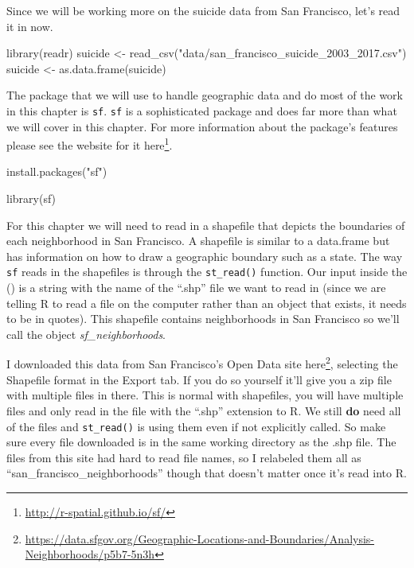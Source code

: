 \documentclass[
]{krantz}
\makeatletter
\newenvironment{Shaded}{\begin{snugshade}}{\end{snugshade}}
\newcommand{\FunctionTok}[1]{\textcolor[rgb]{0,0,0}{#1}}
\newcommand{\NormalTok}[1]{#1}
\newcommand{\OtherTok}[1]{\textcolor[rgb]{0.37,0.37,0.37}{#1}}
\newcommand{\StringTok}[1]{\textcolor[rgb]{0.5,0.5,0.5}{#1}}
\renewcommand{\href}[2]{#2\footnote{\url{#1}}}
\newenvironment{kframe}{%
\medskip{}
\setlength{\fboxsep}{.8em}
 \def\at@end@of@kframe{}%
 \ifinner\ifhmode%
  \def\at@end@of@kframe{\end{minipage}}%
  \begin{minipage}{\columnwidth}%
 \fi\fi%
 \def\FrameCommand##1{\hskip\@totalleftmargin \hskip-\fboxsep
 \colorbox{shadecolor}{##1}\hskip-\fboxsep
     \hskip-\linewidth \hskip-\@totalleftmargin \hskip\columnwidth}%
 \MakeFramed {\advance\hsize-\width
   \@totalleftmargin\z@ \linewidth\hsize
   \@setminipage}}%
 {\par\unskip\endMakeFramed%
 \at@end@of@kframe}
\renewenvironment{Shaded}{\begin{kframe}}{\end{kframe}}
\makeatother
\begin{document}
Since we will be working more on the suicide data from San
Francisco, let's read it in now.

\begin{Shaded}
\begin{Highlighting}[]
\FunctionTok{library}\NormalTok{(readr)}
\NormalTok{suicide }\OtherTok{\textless{}{-}} \FunctionTok{read\_csv}\NormalTok{(}\StringTok{"data/san\_francisco\_suicide\_2003\_2017.csv"}\NormalTok{)}
\NormalTok{suicide }\OtherTok{\textless{}{-}} \FunctionTok{as.data.frame}\NormalTok{(suicide)}
\end{Highlighting}
\end{Shaded}

The package that we will use to handle geographic data and
do most of the work in this chapter is \texttt{sf}.
\texttt{sf} is a sophisticated package and does far more
than what we will cover in this chapter. For more
information about the package's features please see the
website for it \href{http://r-spatial.github.io/sf/}{here}.

\begin{Shaded}
\begin{Highlighting}[]
\FunctionTok{install.packages}\NormalTok{(}\StringTok{"sf"}\NormalTok{)}
\end{Highlighting}
\end{Shaded}

\begin{Shaded}
\begin{Highlighting}[]
\FunctionTok{library}\NormalTok{(sf)}
\end{Highlighting}
\end{Shaded}

For this chapter we will need to read in a shapefile that
depicts the boundaries of each neighborhood in San
Francisco. A shapefile is similar to a data.frame but has
information on how to draw a geographic boundary such as a
state. The way \texttt{sf} reads in the shapefiles is
through the \texttt{st\_read()} function. Our input inside
the () is a string with the name of the ``.shp'' file we
want to read in (since we are telling R to read a file on
the computer rather than an object that exists, it needs to
be in quotes). This shapefile contains neighborhoods in San
Francisco so we'll call the object \emph{sf\_neighborhoods}.

I downloaded this data from San Francisco's Open Data site
\href{https://data.sfgov.org/Geographic-Locations-and-Boundaries/Analysis-Neighborhoods/p5b7-5n3h}{here},
selecting the Shapefile format in the Export tab. If you do
so yourself it'll give you a zip file with multiple files in
there. This is normal with shapefiles, you will have
multiple files and only read in the file with the ``.shp''
extension to R. We still \textbf{do} need all of the files
and \texttt{st\_read()} is using them even if not explicitly
called. So make sure every file downloaded is in the same
working directory as the .shp file. The files from this site
had hard to read file names, so I relabeled them all as
``san\_francisco\_neighborhoods'' though that doesn't matter
once it's read into R.
\end{document}
